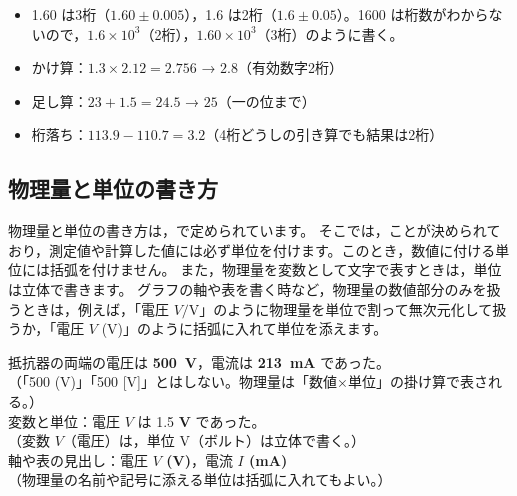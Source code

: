 \begin{hosoku}[例：有効数字の扱い]
\begin{itemize}
  \item 1.60 は3桁（$1.60\pm0.005$），1.6 は2桁（$1.6\pm0.05$）。1600 は桁数がわからないので，$1.6\times10^{3}$（2桁），$1.60\times10^{3}$（3桁）のように書く。
  \item かけ算：$1.3\times2.12=2.756$ → $2.8$（有効数字2桁）
  \item 足し算：$23+1.5=24.5$ → $25$（一の位まで）
  \item 桁落ち：$113.9-110.7=3.2$（4桁どうしの引き算でも結果は2桁）
\end{itemize}
\end{hosoku}

\subsection{物理量と単位の書き方}

物理量と単位の書き方は，で定められています。
そこでは，ことが決められており，測定値や計算した値には必ず単位を付けます。このとき，数値に付ける単位には括弧を付けません。
また，物理量を変数として文字で表すときは，単位は立体で書きます。
グラフの軸や表を書く時など，物理量の数値部分のみを扱うときは，例えば，「電圧 $V/\mathrm{V}$」のように物理量を単位で割って無次元化して扱うか，「電圧 $V$ (V)」のように括弧に入れて単位を添えます。

\begin{hosoku}[例：単位の扱い]
  抵抗器の両端の電圧は \textcolor{EGWarn}{\textbf{\SI{500}{V}}}，電流は \textcolor{EGWarn}{\textbf{\SI{213}{mA}}} であった。\\
  {\small\color{EGWarn}\hspace{3\zw}（「500 (V)」「500 [V]」とはしない。物理量は「数値×単位」の掛け算で表される。）}\\[0.6\baselineskip]
  変数と単位：電圧 \textcolor{EGWarn}{\textbf{$V$}} は 1.5 \textcolor{EGWarn}{\textbf{V}} であった。\\
  {\small\color{EGWarn}\hspace{3\zw}（変数 $V$（電圧）は，単位 V（ボルト）は立体で書く。）}\\[0.6\baselineskip]
  軸や表の見出し：電圧 \textcolor{EGWarn}{\textbf{$V$ (V)}}，電流 \textcolor{EGWarn}{\textbf{$I$ (mA)}}\\
  {\small\color{EGWarn}\hspace{3\zw}（物理量の名前や記号に添える単位は括弧に入れてもよい。）}
\end{hosoku}

